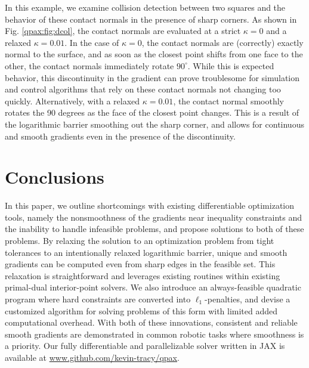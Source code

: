 In this example, we examine collision detection between two squares and the behavior of these contact normals in the presence of sharp corners. As shown in Fig. \ref{qpax:fig:dcol}, the contact normals are evaluated at a strict $\kappa=0$ and a relaxed $\kappa=0.01$. In the case of $\kappa=0$, the contact normals are (correctly) exactly normal to the surface, and as soon as the closest point shifts from one face to the other, the contact normals immediately rotate $90^\circ$. While this is expected behavior, this discontinuity in the gradient can prove troublesome for simulation and control algorithms that rely on these contact normals not changing too quickly. Alternatively, with a relaxed $\kappa=0.01$, the contact normal smoothly rotates the 90 degrees as the face of the closest point changes. This is a result of the logarithmic barrier smoothing out the sharp corner, and allows for continuous and smooth gradients even in the presence of the discontinuity.
\section{Conclusions}
In this paper, we outline shortcomings with existing differentiable optimization tools, namely the nonsmoothness of the gradients near inequality constraints and the inability to handle infeasible problems, and propose solutions to both of these problems. By relaxing the solution to an optimization problem from tight tolerances to an intentionally relaxed logarithmic barrier, unique and smooth gradients can be computed even from sharp edges in the feasible set. This relaxation is straightforward and leverages existing routines within existing primal-dual interior-point solvers. We also introduce an always-feasible quadratic program where hard constraints are converted into $\ell_1$-penalties, and devise a customized algorithm for solving problems of this form with limited added computational overhead. With both of these innovations, consistent and reliable smooth gradients are demonstrated in common robotic tasks where smoothness is a priority. Our fully differentiable and parallelizable solver written in JAX is available at \url{www.github.com/kevin-tracy/qpax}.